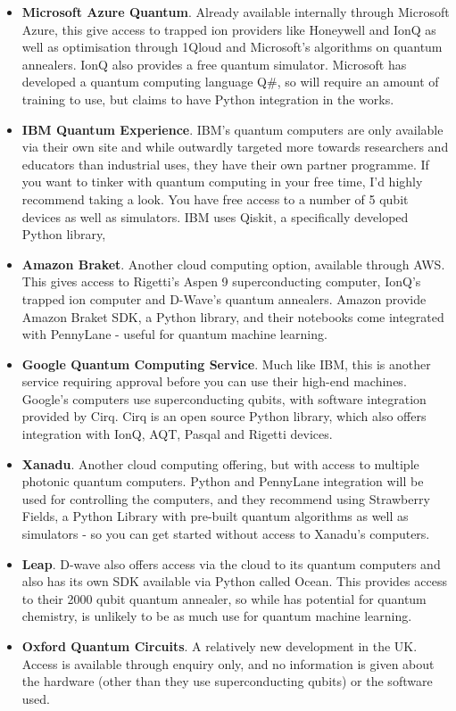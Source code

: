 \documentclass{article}
\theoremstyle{definition}
\begin{document}
\begin{itemize}
    \item \textbf{Microsoft Azure Quantum}. Already available internally through Microsoft Azure, this give access to trapped ion providers like Honeywell and IonQ as well as optimisation through 1Qloud and Microsoft's algorithms on quantum annealers. IonQ also provides a free quantum simulator. Microsoft has developed a quantum computing language Q\#, so will require an amount of training to use, but claims to have Python integration in the works. 
    \item \textbf{IBM Quantum Experience}. IBM's quantum computers are only available via their own site and while outwardly targeted more towards researchers and educators than industrial uses, they have their own partner programme. If you want to tinker with quantum computing in your free time, I'd highly recommend taking a look. You have free access to a number of 5 qubit devices as well as simulators. IBM uses Qiskit, a specifically developed Python library,
    \item \textbf{Amazon Braket}. Another cloud computing option, available through AWS. This gives access to Rigetti's Aspen 9 superconducting computer, IonQ's trapped ion computer and D-Wave's quantum annealers. Amazon provide Amazon Braket SDK, a Python library, and their notebooks come integrated with PennyLane - useful for quantum machine learning. 
    \item \textbf{Google Quantum Computing Service}. Much like IBM, this is another service requiring approval before you can use their high-end machines. Google's computers use superconducting qubits, with software integration provided by Cirq. Cirq is an open source Python library, which also offers integration with IonQ, AQT, Pasqal and Rigetti devices. 
    \item \textbf{Xanadu}. Another cloud computing offering, but with access to multiple photonic quantum computers. Python and PennyLane integration will be used for controlling the computers, and they recommend using Strawberry Fields, a Python Library with pre-built quantum algorithms as well as simulators - so you can get started without access to Xanadu's computers.  
    \item \textbf{Leap}. D-wave also offers access via the cloud to its quantum computers and also has its own SDK available via Python called Ocean. This provides access to their 2000 qubit quantum annealer, so while has potential for quantum chemistry, is unlikely to be as much use for quantum machine learning.
    \item \textbf{Oxford Quantum Circuits}. A relatively new development in the UK. Access is available through enquiry only, and no information is given about the hardware (other than they use superconducting qubits) or the software used. 
\end{itemize}
\end{document}
